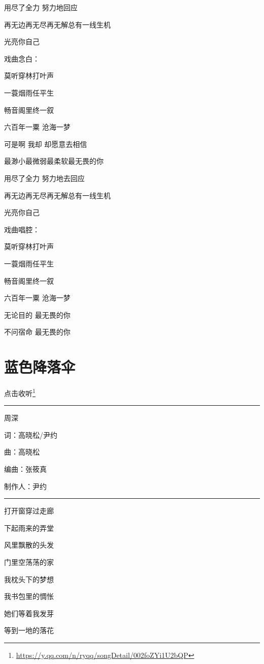 \documentclass[]{ctexbook}
\renewcommand{\href}[2]{#2\footnote{\url{#1}}}
\begin{document}
用尽了全力 努力地回应

再无边再无尽再无解总有一线生机

光亮你自己

戏曲念白：

莫听穿林打叶声

一蓑烟雨任平生

畅音阁里终一叙

六百年一粟 沧海一梦

可是啊 我却 却愿意去相信

最渺小最微弱最柔软最无畏的你

用尽了全力 努力地去回应

再无边再无尽再无解总有一线生机

光亮你自己

戏曲唱腔：

莫听穿林打叶声

一蓑烟雨任平生

畅音阁里终一叙

六百年一粟 沧海一梦

无论目的 最无畏的你

不问宿命 最无畏的你

\section*{蓝色降落伞}\label{blue-parachute}


\href{https://y.qq.com/n/ryqq/songDetail/002foZYi1U2bQP}{点击收听}

\begin{center}\rule{0.5\linewidth}{0.5pt}\end{center}

周深

词：高晓松/尹约

曲：高晓松

编曲：张筱真

制作人：尹约

\begin{center}\rule{0.5\linewidth}{0.5pt}\end{center}

打开窗穿过走廊

下起雨来的弄堂

风里飘散的头发

门里空荡荡的家

我枕头下的梦想

我书包里的惆怅

她们等着我发芽

等到一地的落花
\end{document}
